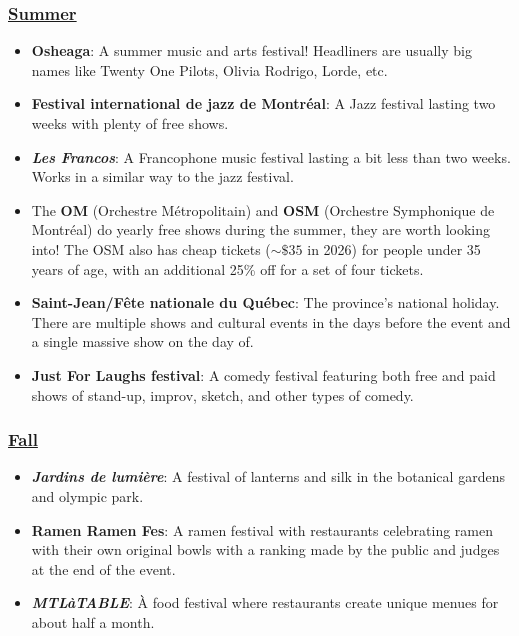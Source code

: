 \subsubsection{\href{https://www.mtl.org/en/experience/montreal-summer-festival-guide}{Summer}}
\begin{itemize}
     \item \textbf{Osheaga}: A summer music and arts festival! Headliners are usually big names like Twenty One Pilots, Olivia Rodrigo, Lorde, etc.
    \item \textbf{Festival international de jazz de Montréal}: A Jazz festival lasting two weeks with plenty of free shows.
    \item \textbf{\textit{Les Francos}}: A Francophone music festival lasting a bit less than two weeks. Works in a similar way to the jazz festival.
    \item The \textbf{OM} (Orchestre Métropolitain) and \textbf{OSM} (Orchestre Symphonique de Montréal) do yearly free shows during the summer, they are worth looking into! The OSM also has cheap tickets ($\sim\$35$ in 2026) for people under 35 years of age, with an additional 25\% off for a set of four tickets.
    \item \textbf{Saint-Jean/Fête nationale du Québec}: The province's national holiday. There are multiple shows and cultural events in the days before the event and a single massive show on the day of.
    \item \textbf{Just For Laughs festival}: A comedy festival featuring both free and paid shows of stand-up, improv, sketch, and other types of comedy.
\end{itemize}     
\subsubsection{\href{https://www.mtl.org/en/experience/fall-festivals-guide}{Fall}}
\begin{itemize}
     \item \textbf{\textit{Jardins de lumière}}: A festival of lanterns and silk in the botanical gardens and olympic park.
    \item \textbf{Ramen Ramen Fes}: A ramen festival with restaurants celebrating ramen with their own original bowls with a ranking made by the public and judges at the end of the event.
    \item \textbf{\textit{MTLàTABLE}}: À food festival where restaurants create unique menues for about half a month.
\end{itemize}     



